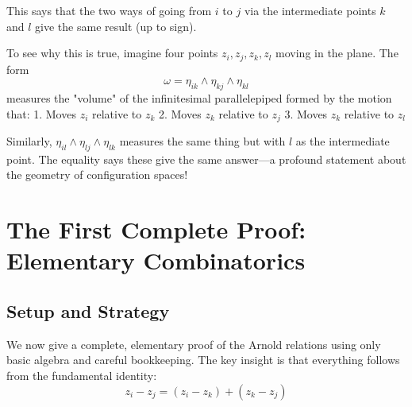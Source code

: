 This says that the two ways of going from $i$ to $j$ via the intermediate points $k$ and $l$ give the same result (up to sign).

To see why this is true, imagine four points $z_i, z_j, z_k, z_l$ moving in the plane. The form 
$$\omega = \eta_{ik} \wedge \eta_{kj} \wedge \eta_{kl}$$
measures the "volume" of the infinitesimal parallelepiped formed by the motion that:
1. Moves $z_i$ relative to $z_k$
2. Moves $z_k$ relative to $z_j$  
3. Moves $z_k$ relative to $z_l$

Similarly, $\eta_{il} \wedge \eta_{lj} \wedge \eta_{lk}$ measures the same thing but with $l$ as the intermediate point. The equality says these give the same answer—a profound statement about the geometry of configuration spaces!

\section{The First Complete Proof: Elementary Combinatorics}

\subsection{Setup and Strategy}

We now give a complete, elementary proof of the Arnold relations using only basic algebra and careful bookkeeping. The key insight is that everything follows from the fundamental identity:
$$z_i - z_j = (z_i - z_k) + (z_k - z_j)$$

